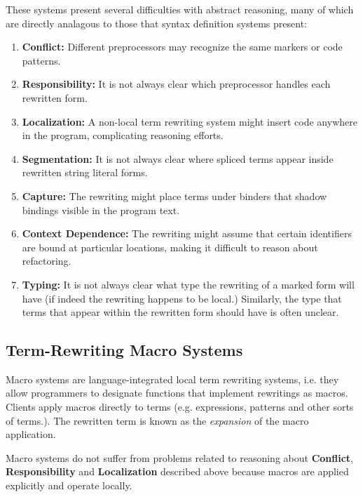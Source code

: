 {{These systems present several difficulties with abstract reasoning, many of which are directly analagous to those that syntax definition systems present:
\begin{enumerate}
\item \textbf{Conflict:} Different preprocessors may recognize the same markers or code patterns.
\item \textbf{Responsibility:} It is not always clear which preprocessor handles each rewritten form.
\item \textbf{Localization:} A non-local term rewriting system might insert code anywhere in the program, complicating reasoning efforts.
\item \textbf{Segmentation:} It is not always clear where spliced terms appear inside rewritten string literal forms.
\item \textbf{Capture:} The rewriting might place terms under binders that shadow bindings visible in the program text.
\item \textbf{Context Dependence:} The rewriting might assume that certain identifiers are bound at particular locations, making it difficult to reason about refactoring.
\item \textbf{Typing:} It is not always clear what type the rewriting of a marked form will have (if indeed the rewriting happens to be local.) Similarly, the type that terms that appear within the rewritten form should have is often unclear.
\end{enumerate}  

\subsection{Term-Rewriting Macro Systems}\label{sec:macro-systems}
Macro systems are language-integrated local term rewriting systems, i.e. they allow programmers to designate functions that implement rewritings as macros. Clients apply macros directly to terms (e.g. expressions, patterns and other sorts of terms.). The rewritten term is known as the \emph{expansion} of the macro application.

Macro systems do not suffer from problems related to reasoning about \textbf{Conflict}, \textbf{Responsibility} and \textbf{Localization} described above because macros are applied explicitly and operate locally.

}}
